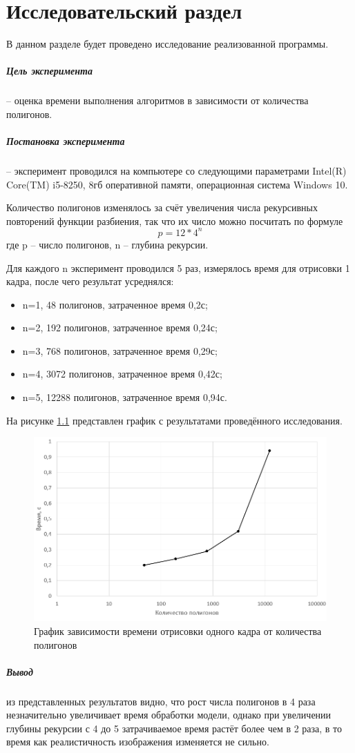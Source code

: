 \chapter{Исследовательский раздел}
\label{cha:research}
В данном разделе будет проведено исследование реализованной программы.
\paragraph{Цель эксперимента} -- оценка времени выполнения алгоритмов в зависимости от количества полигонов.
\paragraph{Постановка эксперимента} -- эксперимент проводился на компьютере со следующими параметрами Intel(R) Core(TM) i5-8250, 8гб оперативной памяти, операционная система Windows 10. 
\par Количество полигонов изменялось за счёт увеличения числа рекурсивных повторений функции разбиения, так что их число можно посчитать по формуле
\begin{equation}
	p=12*4^n
\end{equation} 
где p -- число полигонов, n -- глубина рекурсии.
\par Для каждого n эксперимент проводился 5 раз, измерялось время для отрисовки 1 кадра, после чего результат усреднялся:
\begin{itemize}
	\item n=1, 48 полигонов, затраченное время 0,2с;
	\item n=2, 192 полигонов, затраченное время 0,24с;
	\item n=3, 768 полигонов, затраченное время 0,29с;
	\item n=4, 3072 полигонов, затраченное время 0,42с;
	\item n=5, 12288 полигонов, затраченное время 0,94с.
\end{itemize}
На рисунке \ref{fig:research} представлен график с результатами проведённого исследования.
\begin{figure}[H]
	\centering
	\includegraphics[width=0.7\linewidth]{images/research}
	\caption{График зависимости времени отрисовки одного кадра от количества полигонов}
	\label{fig:research}
\end{figure}

\paragraph{Вывод} из представленных результатов видно, что рост числа полигонов в 4 раза незначительно увеличивает время обработки модели, однако при увеличении глубины рекурсии с 4 до 5 затрачиваемое время растёт более чем в 2 раза, в то время как реалистичность изображения изменяется не сильно.
